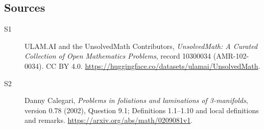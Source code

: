 \documentclass[11pt]{article}
\begin{document}
\subsection{Sources}
\begin{description}
\item[\hypertarget{source:10300034:1}{S1}] ULAM.AI and the UnsolvedMath Contributors, \emph{UnsolvedMath: A Curated Collection of Open Mathematics Problems}, record 10300034 (AMR-102-0034). CC BY 4.0. \url{https://huggingface.co/datasets/ulamai/UnsolvedMath}.
\item[\hypertarget{source:10300034:2}{S2}] Danny Calegari, \emph{Problems in foliations and laminations of 3-manifolds}, version 0.78 (2002), Question 9.1; Definitions 1.1--1.10 and local definitions and remarks. \url{https://arxiv.org/abs/math/0209081v1}.
\end{description}
\label{end:10300034}
\end{document}
